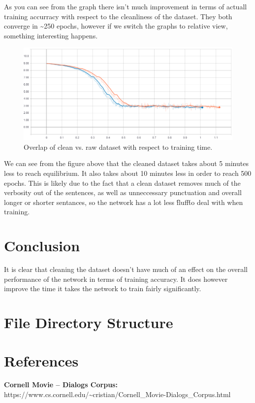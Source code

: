 \documentclass[titlepage]{article}
\begin{document}
As you can see from the graph there isn't much improvement in terms of actuall training accurracy with respect to the cleanliness of the dataset. They both converge in \textasciitilde 250 epochs, however if we switch the graphs to relative view, something interesting happens.
\begin{figure}[H]
	\centering
	\includegraphics[width=120mm]{cost-overlap-relative-001.png}
	\caption{Overlap of clean vs. raw dataset with respect to training time.}
	\label{fig:cor001}
\end{figure} 
We can see from the figure above that the cleaned dataset takes about 5 minutes less to reach equilibrium. It also takes about 10 minutes less in order to reach 500 epochs. This is likely due to the fact that a clean dataset removes much of the verbosity out of the sentences, as well as unneccessary punctuation and overall longer or shorter sentances, so the network has a lot less \'fluff\' to deal with when training. 

\section{Conclusion}
It is clear that cleaning the dataset doesn't have much of an effect on the overall performance of the network in terms of training accuracy. It does however improve the time it takes the network to train fairly significantly.

\section{File Directory Structure}

\section{References}

\textbf{Cornell Movie -- Dialogs Corpus: } https://www.cs.cornell.edu/\textasciitilde cristian/Cornell\_Movie-Dialogs\_Corpus.html
\end{document}

